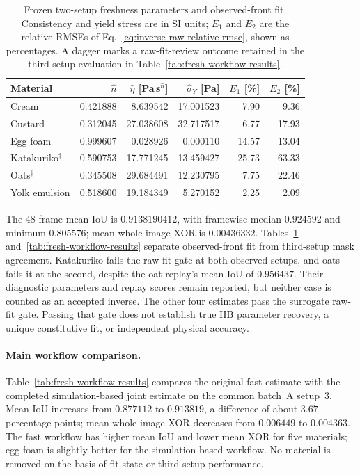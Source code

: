 \begin{table}[!htbp]
\centering\small
\setlength{\tabcolsep}{5pt}
\caption{Frozen two-setup freshness parameters and observed-front fit. Consistency and yield stress are in SI units; $E_1$ and $E_2$ are the relative RMSEs of Eq.~\eqref{eq:inverse-raw-relative-rmse}, shown as percentages. A dagger marks a raw-fit-review outcome retained in the third-setup evaluation in Table~\ref{tab:fresh-workflow-results}.}
\label{tab:fresh-holdout}
\begin{tabular}{@{}lrrrrr@{}}
\toprule
Material & $\hat n$ & $\hat\eta$ [Pa\,s$^{\hat n}$]
 & $\hat\sigma_Y$ [Pa] & $E_1$ [\%] & $E_2$ [\%] \\
\midrule
Cream & 0.421888 & 8.639542 & 17.001523 & 7.90 & 9.36 \\
Custard & 0.312045 & 27.038608 & 32.717517 & 6.77 & 17.93 \\
Egg foam & 0.999607 & 0.028926 & 0.000110 & 14.57 & 13.04 \\
Katakuriko$^\dagger$ & 0.590753 & 17.771245 & 13.459427 & 25.73 & 63.33 \\
Oats$^\dagger$ & 0.345508 & 29.684491 & 12.230795 & 7.75 & 22.46 \\
Yolk emulsion & 0.518600 & 19.184349 & 5.270152 & 2.25 & 2.09 \\
\bottomrule
\end{tabular}
\end{table}

The 48-frame mean IoU is $0.9138190412$, with framewise median
$0.924592$ and minimum $0.805576$; mean whole-image XOR is
$0.00436332$. Tables~\ref{tab:fresh-holdout} and~\ref{tab:fresh-workflow-results} separate observed-front fit from third-setup mask agreement.
Katakuriko fails the raw-fit gate at both observed setups, and oats
fails it at the second, despite the oat replay's mean IoU of $0.956437$.
Their diagnostic parameters and replay scores remain reported, but
neither case is counted as an accepted inverse. The other four estimates
pass the surrogate raw-fit gate. Passing that gate does not establish
true HB parameter recovery, a unique constitutive fit, or independent
physical accuracy.


\paragraph{Main workflow comparison.}
Table~\ref{tab:fresh-workflow-results} compares the original fast
estimate with the completed simulation-based joint estimate on the
common batch~A setup~3. Mean IoU increases from $0.877112$ to
$0.913819$, a difference of about $3.67$ percentage points; mean
whole-image XOR decreases from $0.006449$ to $0.004363$.
The fast workflow has higher mean IoU and lower mean XOR for five
materials; egg foam is slightly better for the simulation-based
workflow. No material is removed on the basis of fit state or
third-setup performance.

